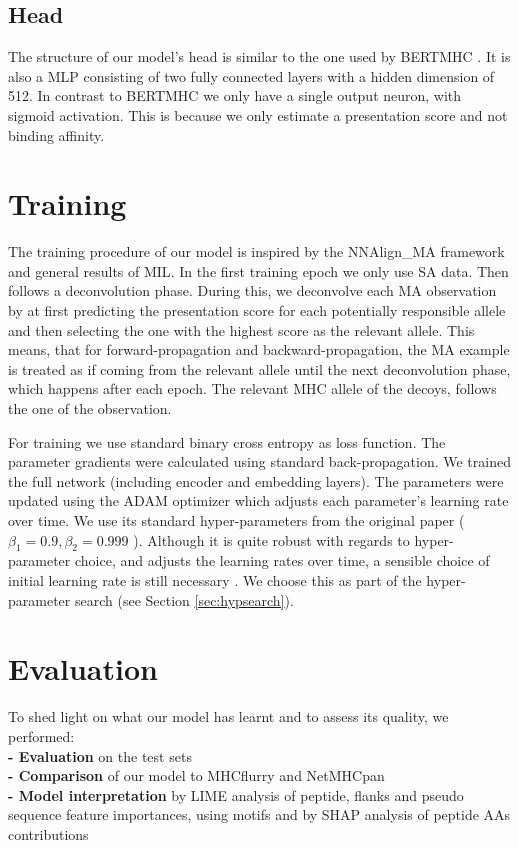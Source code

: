 \documentclass[msc,deptreport,ai]{infthesis} %
\begin{document}
		\subsection{Head}
			The structure of our model's head is similar to the one used by BERTMHC \cite{cheng_bertmhc_2020}. It is also a \gls{MLP} consisting of two fully connected layers with a hidden dimension of 512. In contrast to BERTMHC we only have a single output neuron, with sigmoid activation. This is because we only estimate a presentation score and not binding affinity.
			
	\section{Training}
		The training procedure of our model is inspired by the  NNAlign\_MA framework and general results of \gls{MIL}. In the first training epoch we only use \gls{SA} data. Then follows a deconvolution phase. During this, we deconvolve each \gls{MA} observation by at first predicting the presentation score for each potentially responsible allele and then selecting the one with the highest score as the relevant allele. This means, that for forward-propagation and backward-propagation, the \gls{MA} example is treated as if coming from the relevant allele until the next deconvolution phase, which happens after each epoch. The relevant \gls{MHC} allele of the decoys, follows the one of the observation.
		
		For training we use standard binary cross entropy as loss function. The parameter gradients were calculated using standard back-propagation. We trained the full network (including encoder and embedding layers). The parameters were updated using the ADAM optimizer which adjusts each parameter's learning rate over time. We use its standard hyper-parameters from the original paper ($\beta_1 = 0.9, \beta_2 = 0.999$ \cite{kingma_adam_2017}). Although it is quite robust with regards to hyper-parameter choice, and adjusts the learning rates over time, a sensible choice of initial learning rate is still necessary \cite[page 306]{goodfellow_deep_2016}. We choose this as  part of the hyper-parameter search (see Section \ref{sec:hypsearch}). 
		
	\section{Evaluation}
		To shed light on what our model has learnt and to assess its quality, we performed:\\
		\textbf{- Evaluation} on the test sets\\
		\textbf{- Comparison} of our model to MHCflurry and NetMHCpan\\
		\textbf{- Model interpretation} by \gls{LIME} analysis of peptide, flanks and pseudo sequence feature importances, using motifs and by \gls{SHAP} analysis of peptide \glspl{AA} contributions
		
\end{document}
